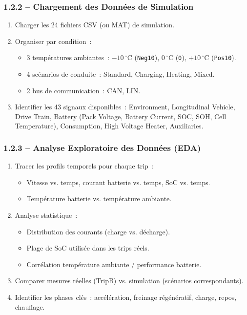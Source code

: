 \documentclass[a4paper,12pt]{article}
\begin{document}
\subsubsection{1.2.2 -- Chargement des Données de Simulation}
\begin{enumerate}[nosep]
  \item Charger les 24 fichiers CSV (ou MAT) de simulation.
  \item Organiser par condition~:
    \begin{itemize}[nosep]
      \item 3 températures ambiantes~: $-10\,^{\circ}$C (\texttt{Neg10}), $0\,^{\circ}$C (\texttt{0}), $+10\,^{\circ}$C (\texttt{Pos10}).
      \item 4 scénarios de conduite~: Standard, Charging, Heating, Mixed.
      \item 2 bus de communication~: CAN, LIN.
    \end{itemize}
  \item Identifier les 43 signaux disponibles~: Environment, Longitudinal Vehicle, Drive Train, Battery (Pack Voltage, Battery Current, SOC, SOH, Cell Temperature), Consumption, High Voltage Heater, Auxiliaries.
\end{enumerate}

\subsubsection{1.2.3 -- Analyse Exploratoire des Données (EDA)}
\begin{enumerate}[nosep]
  \item Tracer les profils temporels pour chaque trip~:
    \begin{itemize}[nosep]
      \item Vitesse vs. temps, courant batterie vs. temps, SoC vs. temps.
      \item Température batterie vs. température ambiante.
    \end{itemize}
  \item Analyse statistique~:
    \begin{itemize}[nosep]
      \item Distribution des courants (charge vs. décharge).
      \item Plage de SoC utilisée dans les trips réels.
      \item Corrélation température ambiante / performance batterie.
    \end{itemize}
  \item Comparer mesures réelles (TripB) vs. simulation (scénarios correspondants).
  \item Identifier les phases clés~: accélération, freinage régénératif, charge, repos, chauffage.
\end{enumerate}
\end{document}
